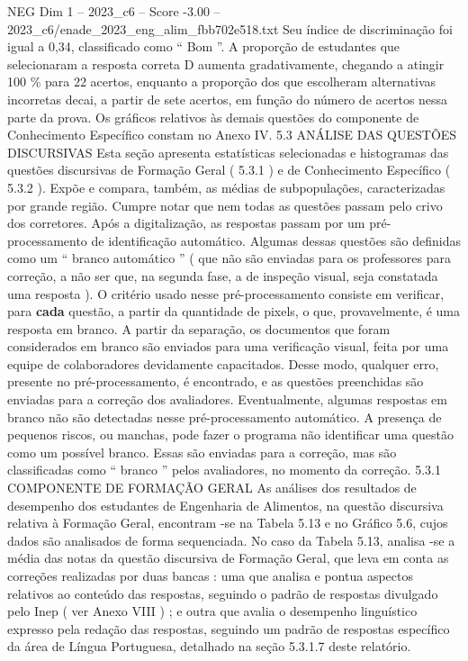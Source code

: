 \begin{textsample}{NEG Dim 1 – 2023\_c6 – Score -3.00 – 2023\_c6/enade\_2023\_eng\_alim\_fbb702e518.txt}
Seu índice de discriminação foi igual a 0,34, classificado como “ Bom ”.
A proporção de estudantes que selecionaram a resposta correta D aumenta gradativamente, chegando a atingir 100 \% para 22 acertos, enquanto a proporção dos que escolheram alternativas incorretas decai, a partir de sete acertos, em função do número de acertos nessa parte da prova.
Os gráficos relativos às demais questões do componente de Conhecimento Específico constam no Anexo IV. 5.3 ANÁLISE DAS QUESTÕES DISCURSIVAS Esta seção apresenta estatísticas selecionadas e histogramas das questões discursivas de Formação Geral ( 5.3.1 ) e de Conhecimento Específico ( 5.3.2 ).
Expõe e compara, também, as médias de subpopulações, caracterizadas por grande região.
Cumpre notar que nem todas as questões passam pelo crivo dos corretores.
Após a digitalização, as respostas passam por um pré-processamento de identificação automático.
Algumas dessas questões são definidas como um “ branco automático ” ( que não são enviadas para os professores para correção, a não ser que, na segunda fase, a de inspeção visual, seja constatada uma resposta ).
O critério usado nesse pré-processamento consiste em verificar, para \textbf{cada} questão, a partir da quantidade de pixels, o que, provavelmente, é uma resposta em branco.
A partir da separação, os documentos que foram considerados em branco são enviados para uma verificação visual, feita por uma equipe de colaboradores devidamente capacitados.
Desse modo, qualquer erro, presente no pré-processamento, é encontrado, e as questões preenchidas são enviadas para a correção dos avaliadores.
Eventualmente, algumas respostas em branco não são detectadas nesse pré-processamento automático.
A presença de pequenos riscos, ou manchas, pode fazer o programa não identificar uma questão como um possível branco.
Essas são enviadas para a correção, mas são classificadas como “ branco ” pelos avaliadores, no momento da correção. 5.3.1 COMPONENTE DE FORMAÇÃO GERAL As análises dos resultados de desempenho dos estudantes de Engenharia de Alimentos, na questão discursiva relativa à Formação Geral, encontram -se na Tabela 5.13 e no Gráfico 5.6, cujos dados são analisados de forma sequenciada.
No caso da Tabela 5.13, analisa -se a média das notas da questão discursiva de Formação Geral, que leva em conta as correções realizadas por duas bancas : uma que analisa e pontua aspectos relativos ao conteúdo das respostas, seguindo o padrão de respostas divulgado pelo Inep ( ver Anexo VIII ) ; e outra que avalia o desempenho linguístico expresso pela redação das respostas, seguindo um padrão de respostas específico da área de Língua Portuguesa, detalhado na seção 5.3.1.7 deste relatório.

\end{textsample}
